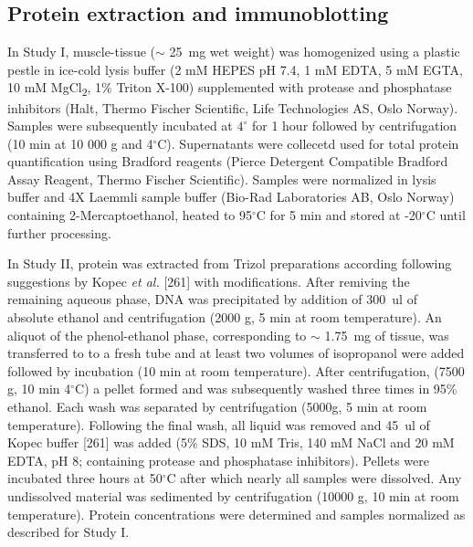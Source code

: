 \documentclass[twoside,10pt]{gihclass} %
\begin{document}
\hypertarget{protein-extraction-and-immunoblotting}{%
\subsection{Protein extraction and immunoblotting}\label{protein-extraction-and-immunoblotting}}

In Study I, muscle-tissue (\(\sim\) \SI{25}{mg} wet weight) was homogenized using a plastic pestle in ice-cold lysis buffer (2 mM HEPES pH 7.4, 1 mM EDTA, 5 mM EGTA, 10 mM MgCl\textsubscript{2}, 1\(\%\) Triton X-100) supplemented with protease and phosphatase inhibitors (Halt, Thermo Fischer Scientific, Life Technologies AS, Oslo Norway). Samples were subsequently incubated at \(4^{\circ}\) for 1 hour followed by centrifugation (10 min at 10 000 g and 4\(^{\circ}\)C). Supernatants were collecetd used for total protein quantification using Bradford reagents (Pierce Detergent Compatible Bradford Assay Reagent, Thermo Fischer Scientific).
Samples were normalized in lysis buffer and 4X Laemmli sample buffer (Bio-Rad Laboratories AB, Oslo Norway) containing 2-Mercaptoethanol, heated to 95\(^{\circ}\)C for 5 min and stored at -20\(^{\circ}\)C until further processing.

In Study II, protein was extracted from Trizol preparations according following suggestions by Kopec \emph{et al.} {[}261{]}
with modifications. After remiving the remaining aqueous phase, DNA was precipitated by addition of \SI{300}{ul} of absolute ethanol and centrifugation (2000 g, 5 min at room temperature). An aliquot of the phenol-ethanol phase, corresponding to \(\sim\) \SI{1.75}{mg} of tissue, was transferred to to a fresh tube and at least two volumes of isopropanol were added followed by incubation (10 min at room temperature). After centrifugation, (7500 g, 10 min 4\(^{\circ}\)C) a pellet formed and was subsequently washed three times in 95\% ethanol. Each wash was separated by centrifugation (5000g, 5 min at room temperature). Following the final wash, all liquid was removed and \SI{45}{ul} of Kopec buffer {[}261{]} was added (5\% SDS, 10 mM Tris, 140 mM NaCl and 20 mM EDTA, pH 8; containing protease and phosphatase inhibitors).
Pellets were incubated three hours at 50\(^{\circ}\)C after which nearly all samples were dissolved.
Any undissolved material was sedimented by centrifugation (10000 g, 10 min at room temperature).
Protein concentrations were determined and samples normalized as described for Study I.
\end{document}
